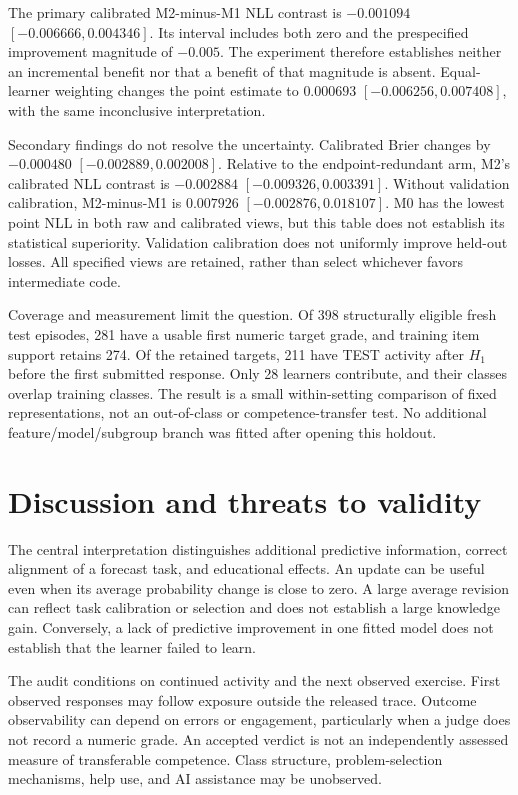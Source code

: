 \documentclass[11pt]{article}
\newcommand{\1}{\mathbb{I}}
\begin{document}
The primary calibrated M2-minus-M1 NLL contrast is $-0.001094$ $[-0.006666,0.004346]$. Its interval includes both zero and the prespecified improvement magnitude of $-0.005$. The experiment therefore establishes neither an incremental benefit nor that a benefit of that magnitude is absent. Equal-learner weighting changes the point estimate to $0.000693$ $[-0.006256,0.007408]$, with the same inconclusive interpretation.

Secondary findings do not resolve the uncertainty. Calibrated Brier changes by $-0.000480$ $[-0.002889,0.002008]$. Relative to the endpoint-redundant arm, M2's calibrated NLL contrast is $-0.002884$ $[-0.009326,0.003391]$. Without validation calibration, M2-minus-M1 is $0.007926$ $[-0.002876,0.018107]$. M0 has the lowest point NLL in both raw and calibrated views, but this table does not establish its statistical superiority. Validation calibration does not uniformly improve held-out losses. All specified views are retained, rather than select whichever favors intermediate code.

Coverage and measurement limit the question. Of 398 structurally eligible fresh test episodes, 281 have a usable first numeric target grade, and training item support retains 274. Of the retained targets, 211 have TEST activity after $H_1$ before the first submitted response. Only 28 learners contribute, and their classes overlap training classes. The result is a small within-setting comparison of fixed representations, not an out-of-class or competence-transfer test. No additional feature/model/subgroup branch was fitted after opening this holdout.

\section{Discussion and threats to validity}
The central interpretation distinguishes additional predictive information, correct alignment of a forecast task, and educational effects. An update can be useful even when its average probability change is close to zero. A large average revision can reflect task calibration or selection and does not establish a large knowledge gain. Conversely, a lack of predictive improvement in one fitted model does not establish that the learner failed to learn.

The audit conditions on continued activity and the next observed exercise. First observed responses may follow exposure outside the released trace. Outcome observability can depend on errors or engagement, particularly when a judge does not record a numeric grade. An accepted verdict is not an independently assessed measure of transferable competence. Class structure, problem-selection mechanisms, help use, and AI assistance may be unobserved.
\end{document}
